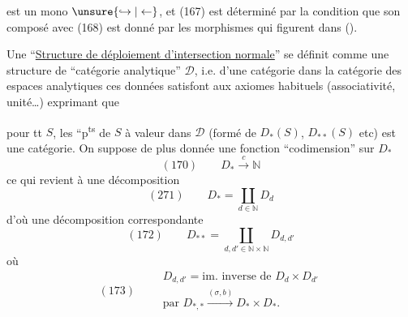 est un mono $\unsure{\hookrightarrow|\leftarrow}$, et (167) est déterminé par la condition que son composé avec (168) est donné par les morphismes
qui figurent dans ().

Une ``\uline{Structure de déploiement d'intersection normale}'' se définit  comme une structure de ``catégorie  analytique'' $\mathcal D$, i.e. d'une catégorie dans la catégorie des espaces analytiques
 ces données satisfont aux axiomes habituels (associativité, unité\ldots) exprimant que

pour tt $S$, les  ``p\textsuperscript{ts} de $S$ à valeur dans $\mathcal D$ (formé de $D_*(S)$, $D_{**}(S)$ etc) est une catégorie. On suppose de plus donnée une fonction ``codimension'' sur $D_*$
\[
(170)\qquad D_*\xrightarrow{c}\mathbb N
\]
ce qui revient à une décomposition
\[
(271)\qquad D_*=\coprod_{d\in\mathbb N}D_d
\]
d'où une décomposition correspondante
\[
(172)\qquad D_{**}=\coprod_{d,d'\in\mathbb N\times\mathbb N}D_{d,d'}
\]
où
\[
(173)\qquad\begin{gathered}
D_{d,d'}=\text{im. inverse de }D_d\times D_{d'}\\
\text{par }D_{*,*}\xrightarrow{(\sigma,b)}D_*\times D_*.
\end{gathered}
\]


